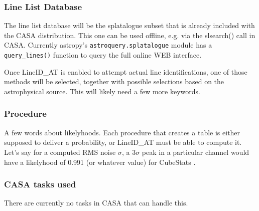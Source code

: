 \subsubsection{Line List Database}

The line list database will be the splatalogue subset that is already included with the CASA distribution.
This one can be used offline, e.g. via the slsearch() call in CASA.
Currently astropy's {\tt astroquery.splatalogue} module has a {\tt query\_lines()} function to query the
full online WEB interface.

Once LineID\_AT is enabled to attempt actual line identifications, one of those methods will
be selected, together with possible selections based on the astrophysical source. This will
likely need a few more keywords.


\subsubsection{Procedure}

A few words about likelyhoods.   Each procedure that creates a table is either supposed to deliver 
a probability, or LineID\_AT must be able to compute it.   Let's say for a computed RMS noise
$\sigma$, a $3\sigma$ peak in a particular channel would have a likelyhood
of 0.991 (or whatever value) for CubeStats .

\subsubsection{CASA tasks used}

There are currently no tasks in CASA that can handle this. 

\clearpage
